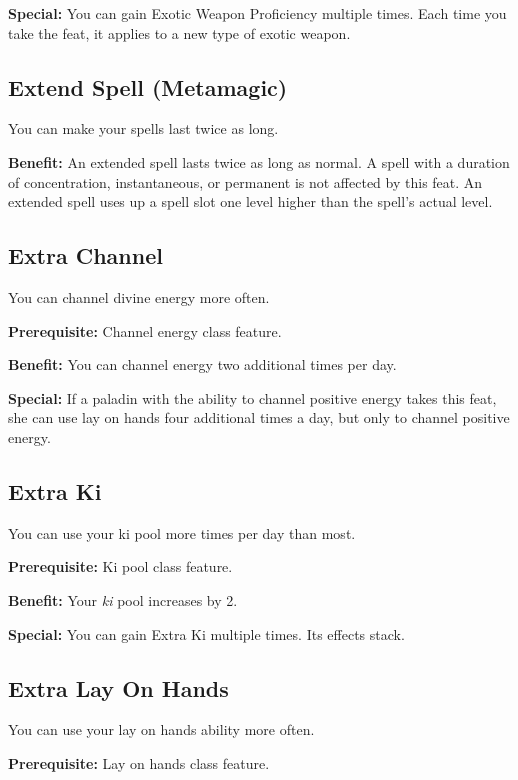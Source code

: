 \textbf{Special:} You can gain Exotic Weapon Proficiency multiple times. Each time you take the feat, it applies to a new type of exotic weapon. 
				
\subsection{Extend Spell (Metamagic)}

				
You can make your spells last twice as long.
				
\textbf{Benefit:} An extended spell lasts twice as long as normal. A spell with a duration of concentration, instantaneous, or permanent is not affected by this feat. An extended spell uses up a spell slot one level higher than the spell's actual level.
				
\subsection{Extra Channel}

				
You can channel divine energy more often.
				
\textbf{Prerequisite:} Channel energy class feature.
				
\textbf{Benefit:} You can channel energy two additional times per day.
				
\textbf{Special:} If a paladin with the ability to channel positive energy takes this feat, she can use lay on hands four additional times a day, but only to channel positive energy.
				
\subsection{Extra Ki}

				
You can use your ki pool more times per day than most.
				
\textbf{Prerequisite:} Ki pool class feature.
				
\textbf{Benefit:} Your \textit{ki }pool increases by 2. 
				
\textbf{Special:} You can gain Extra Ki multiple times. Its effects stack.
				
\subsection{Extra Lay On Hands}

				
You can use your lay on hands ability more often.
				
\textbf{Prerequisite:} Lay on hands class feature.
				

